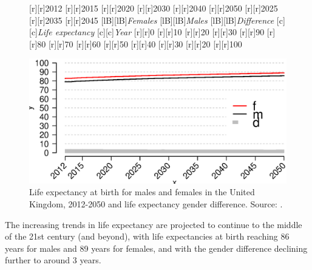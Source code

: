 \documentclass[11 pt, a4paper]{report}
\begin{document}
\begin{figure}[hbtp!]
[r][r]{\small{2012}}
[r][r]{\small{2015}}
[r][r]{\small{2020}}
[r][r]{\small{2030}}
[r][r]{\small{2040}}
[r][r]{\small{2050}}
[r][r]{\small{2025}}
[r][r]{\small{2035}}
[r][r]{\small{2045}}
[lB][lB]{\small{\emph{Females}}}
[lB][lB]{\small{\emph{Males}}}
[lB][lB]{\small{\emph{Difference}}}
[c][c]{\small{\emph{Life expectancy}}}
[c][c]{\small{\emph{Year}}}
[r][r]{\small{0}}
[r][r]{\small{10}}
[r][r]{\small{20}}
[r][r]{\small{30}}
[r][r]{\small{90}}
[r][r]{\small{80}}
[r][r]{\small{70}}
[r][r]{\small{60}}
[r][r]{\small{50}}
[r][r]{\small{40}}
[r][r]{\small{30}}
[r][r]{\small{20}}
[r][r]{\small{100}}

\includegraphics[width=\textwidth]{../figures/Fig2.4.eps}
\caption{Life expectancy at birth for males and females in the United Kingdom, 2012-2050 and life expectancy gender difference. Source: \cite{ONS2013c}.}
\label{Fig:10}
\end{figure}

The increasing trends in life expectancy are projected to continue to the middle of the 21st century (and beyond), with life expectancies at birth reaching 86 years for males and 89 years for females, and with the gender difference declining further to around 3 years. 
\end{document}
